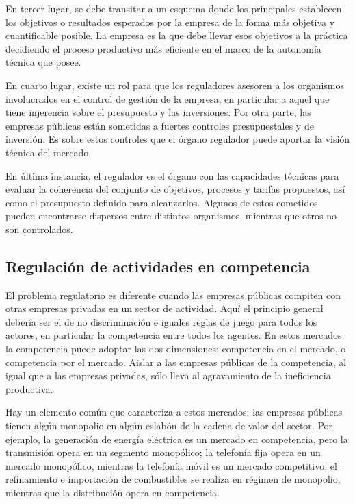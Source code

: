 \documentclass[
  12pt,
  spanish,
]{book}
\begin{document}
En tercer lugar, se debe transitar a un esquema donde los principales establecen los objetivos o resultados esperados por la empresa de la forma más objetiva y cuantificable posible. La empresa es la que debe llevar esos objetivos a la práctica decidiendo el proceso productivo más eficiente en el marco de la autonomía técnica que posee.

En cuarto lugar, existe un rol para que los reguladores asesoren a los organismos involucrados en el control de gestión de la empresa, en particular a aquel que tiene injerencia sobre el presupuesto y las inversiones. Por otra parte, las empresas públicas están sometidas a fuertes controles presupuestales y de inversión. Es sobre estos controles que el órgano regulador puede aportar la visión técnica del mercado.

En última instancia, el regulador es el órgano con las capacidades técnicas para evaluar la coherencia del conjunto de objetivos, procesos y tarifas propuestos, así como el presupuesto definido para alcanzarlos. Algunos de estos cometidos pueden encontrarse dispersos entre distintos organismos, mientras que otros no son controlados.

\hypertarget{regulaciuxf3n-de-actividades-en-competencia}{%
\subsection{Regulación de actividades en competencia}\label{regulaciuxf3n-de-actividades-en-competencia}}

El problema regulatorio es diferente cuando las empresas públicas compiten con otras empresas privadas en un sector de actividad. Aquí el principio general debería ser el de no discriminación e iguales reglas de juego para todos los actores, en particular la competencia entre todos los agentes. En estos mercados la competencia puede adoptar las dos dimensiones: competencia en el mercado, o competencia por el mercado. Aislar a las empresas públicas de la competencia, al igual que a las empresas privadas, sólo lleva al agravamiento de la ineficiencia productiva.

Hay un elemento común que caracteriza a estos mercados: las empresas públicas tienen algún monopolio en algún eslabón de la cadena de valor del sector. Por ejemplo, la generación de energía eléctrica es un mercado en competencia, pero la transmisión opera en un segmento monopólico; la telefonía fija opera en un mercado monopólico, mientras la telefonía móvil es un mercado competitivo; el refinamiento e importación de combustibles se realiza en régimen de monopolio, mientras que la distribución opera en competencia.
\end{document}
